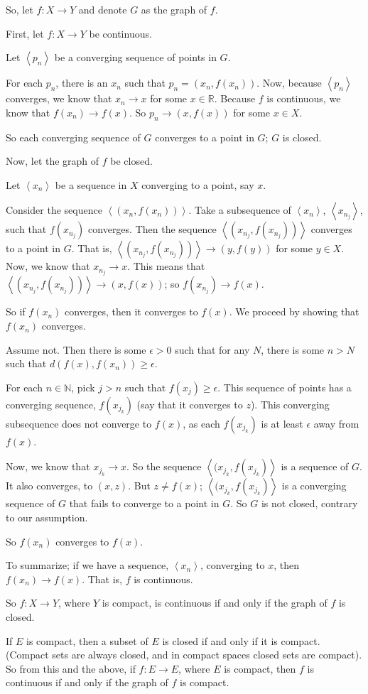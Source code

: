 \documentclass[a4paper,12pt]{article}
\newcommand{\tab}{\hspace{4mm}} %
\newcommand{\anbrack}[1]{\left\langle #1 \right\rangle}
\newcommand{\ep}{\epsilon}
\newcommand{\N}{\mathbb{N}}
\newcommand{\R}{\mathbb{R}}
\begin{document}
So, let $f: X \to Y$ and denote $G$ as the graph of $f$.

First, let $f: X \to Y$ be continuous.

\tab Let $\anbrack{p_n}$ be a converging sequence of points in $G$.

\tab For each $p_n$, there is an $x_n$ such that $p_n = (x_n, f(x_n))$. Now, because $\anbrack{p_n}$ converges, we know that $x_n \to x$ for some $x \in \R$. Because $f$ is continuous, we know that $f(x_n) \to f(x)$. So $p_n \to (x,f(x))$ for some $x \in X$.

\tab So each converging sequence of $G$ converges to a point in $G$; $G$ is closed.

Now, let the graph of $f$ be closed.

\tab Let $\anbrack{x_n}$ be a sequence in $X$ converging to a point, say $x$.

\tab Consider the sequence $\anbrack{(x_n,f(x_n))}$. Take a subsequence of $\anbrack{x_n}$, $\anbrack{x_{n_j}}$, such that $f(x_{n_j})$ converges. Then the sequence $\anbrack{(x_{n_j},f(x_{n_j}))}$ converges to a point in $G$. That is, $\anbrack{(x_{n_j},f(x_{n_j}))} \to (y, f(y))$ for some $y \in X$. Now, we know that $x_{n_j} \to x$. This means that $\anbrack{(x_{n_j},f(x_{n_j}))} \to (x, f(x))$; so $f(x_{n_j}) \to f(x)$.

\tab So if $f(x_n)$ converges, then it converges to $f(x)$. We proceed by showing that $f(x_n)$ converges.

\tab \tab Assume not. Then there is some $\ep >0$ such that for any $N$, there is some $n >N$ such that $d(f(x),f(x_n)) \geq \ep$.

\tab \tab For each $n \in \N$, pick $j >n$ such that $f(x_j) \geq \ep$. This sequence of points has a converging sequence, $f(x_{j_k})$ (say that it converges to $z$). This converging subsequence does not converge to $f(x)$, as each $f(x_{j_k})$ is at least $\ep$ away from $f(x)$.

\tab \tab Now, we know that $x_{j_k} \to x$. So the sequence $\anbrack{(x_{j_k},f(x_{j_k})}$ is a sequence of $G$. It also converges, to $(x,z)$. But $z \neq f(x)$; $\anbrack{(x_{j_k},f(x_{j_k})}$ is a converging sequence of $G$ that fails to converge to a point in $G$. So $G$ is not closed, contrary to our assumption.

\tab So $f(x_n)$ converges to $f(x)$.

\tab To summarize; if we have a sequence, $\anbrack{x_n}$, converging to $x$, then $f(x_n) \to f(x)$. That is, $f$ is continuous.

So $f: X \to Y$, where $Y$ is compact, is continuous if and only if the graph of $f$ is closed.

If $E$ is compact, then a subset of $E$ is closed if and only if it is compact. (Compact sets are always closed, and in compact spaces closed sets are compact). So from this and the above, if $f: E \to E$, where $E$ is compact, then $f$ is continuous if and only if the graph of $f$ is compact.
\end{document}
